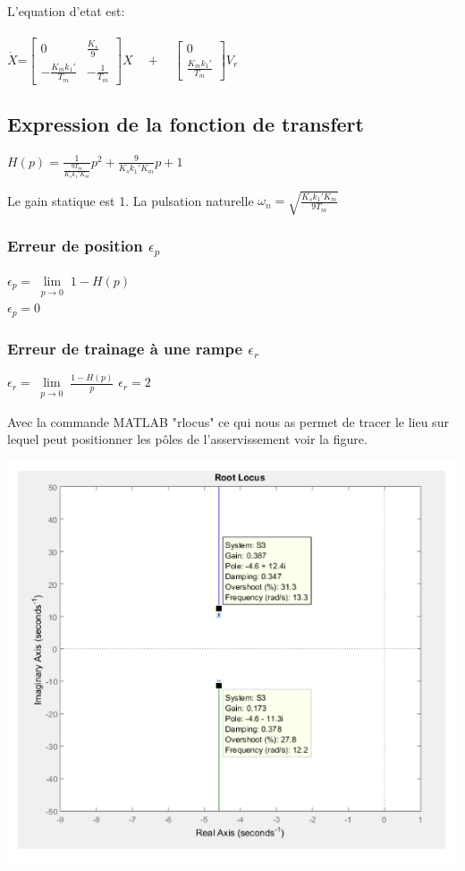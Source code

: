 L'equation d'etat est:\\\\


$\dot{X}$=$\begin{bmatrix}
0&\frac{K_s}{9}\\
-\frac{K_mk_1'}{T_m}&-\frac{1}{T_m}
\end{bmatrix}X
\quad + \quad
\begin{bmatrix}
0\\
\frac{K_mk_1'}{T_m}
\end{bmatrix}V_r
$

\subsection{Expression de la fonction de transfert}


\begin{center}
$H(p)=\frac{1}{\frac{9T_m}{K_sk_1'K_m}}p^2+\frac{9}{K_sk_1'K_m}p+1$
\end{center}


Le gain statique est 1.
La pulsation naturelle $\omega_n=\sqrt{\frac{K_sk_1'K_m}{9T_m}}$

\subsubsection{Erreur de position $\epsilon_p$}
$\epsilon_p=\lim\limits_{\substack{p \rightarrow 0 }} 1-H(p)$\\
$\epsilon_p=0$

\subsubsection{Erreur de trainage à une rampe $\epsilon_r$}
$\epsilon_r=\lim\limits_{\substack{p \rightarrow 0 }} \frac{1-H(p)}{p}$
$\epsilon_r=2$

Avec la commande MATLAB "rlocus" ce qui nous as permet de  tracer le lieu sur lequel peut  positionner les pôles de l'asservissement voir la figure.



\begin{center}
\includegraphics[scale=0.5]{fiiig4.png}
\label{fig4} 
\end{center}